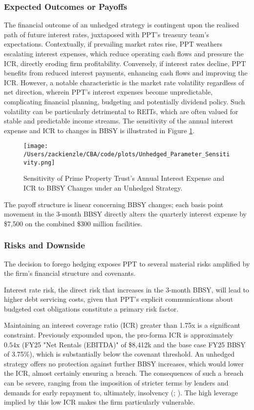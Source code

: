 \documentclass[11pt, a4paper, british]{article}
\begin{document}
\subsubsection{Expected Outcomes or Payoffs}
The financial outcome of an unhedged strategy is contingent upon the realised path of future interest rates, juxtaposed with PPT's treasury team's expectations. Contextually, if prevailing market rates rise, PPT weathers escalating interest expenses, which reduce operating cash flows and pressure the ICR, directly eroding firm profitability. Conversely, if interest rates decline, PPT benefits from reduced interest payments, enhancing cash flows and improving the ICR. However, a notable characteristic is the market rate volatility regardless of net direction, wherein PPT's interest expenses become unpredictable, complicating financial planning, budgeting and potentially dividend policy. Such volatility can be particularly detrimental to REITs, which are often valued for stable and predictable income streams. The sensitivity of the annual interest expense and ICR to changes in BBSY is illustrated in Figure \ref{fig:UnhedgedParameterSensitivity}.

\begin{figure}[H]
 \centering
 \texttt{[image: /Users/zackienzle/CBA/code/plots/Unhedged\_Parameter\_Sensitivity.png]} 
 \caption{Sensitivity of Prime Property Trust's Annual Interest Expense and ICR to BBSY Changes under an Unhedged Strategy.}
    \label{fig:UnhedgedParameterSensitivity}
\end{figure}

The payoff structure is linear concerning BBSY changes; each basis point movement in the 3-month BBSY directly alters the quarterly interest expense by \$7,500 on the combined \$300 million facilities.
\subsubsection{Risks and Downside}
The decision to forego hedging exposes PPT to several material risks amplified by the firm's financial structure and covenants. 

Interest rate risk, the direct risk that increases in the 3-month BBSY, will lead to higher debt servicing costs, given that PPT's explicit communications about budgeted cost obligations constitute a primary risk factor.

Maintaining an interest coverage ratio (ICR) greater than 1.75x is a significant constraint. Previously expounded upon, the pro-forma ICR is approximately $0.54 \text{x}$ (FY25 "Net Rentals (EBITDA)" of \$8,412k and the base case FY25 BBSY of 3.75\%), which is substantially below the covenant threshold. An unhedged strategy offers no protection against further BBSY increases, which would lower the ICR, almost certainly ensuring a breach. The consequences of such a breach can be severe, ranging from the imposition of stricter terms by lenders and demands for early repayment to, ultimately, insolvency (\cite{ss}; \cite{tw}). The high leverage implied by this low ICR makes the firm particularly vulnerable.
\end{document}
